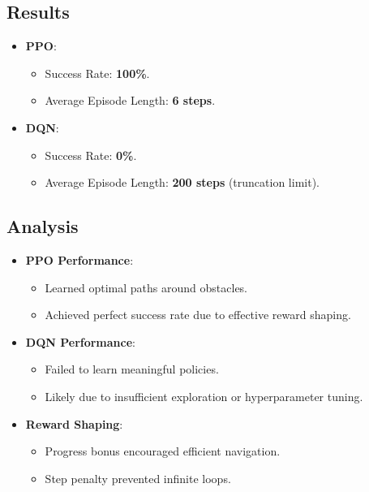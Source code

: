 \documentclass[12pt]{article}
\begin{document}
{{{\subsection*{Results}
\begin{itemize}
    \item \textbf{PPO}:
    \begin{itemize}
        \item Success Rate: \textbf{100\%}.
        \item Average Episode Length: \textbf{6 steps}.
    \end{itemize}
    \item \textbf{DQN}:
    \begin{itemize}
        \item Success Rate: \textbf{0\%}.
        \item Average Episode Length: \textbf{200 steps} (truncation limit).
    \end{itemize}
\end{itemize}

\subsection*{Analysis}
\begin{itemize}
    \item \textbf{PPO Performance}:
    \begin{itemize}
        \item Learned optimal paths around obstacles.
        \item Achieved perfect success rate due to effective reward shaping.
    \end{itemize}
    \item \textbf{DQN Performance}:
    \begin{itemize}
        \item Failed to learn meaningful policies.
        \item Likely due to insufficient exploration or hyperparameter tuning.
    \end{itemize}
    \item \textbf{Reward Shaping}:
    \begin{itemize}
        \item Progress bonus encouraged efficient navigation.
        \item Step penalty prevented infinite loops.
    \end{itemize}
\end{itemize}

}}}
\end{document}
